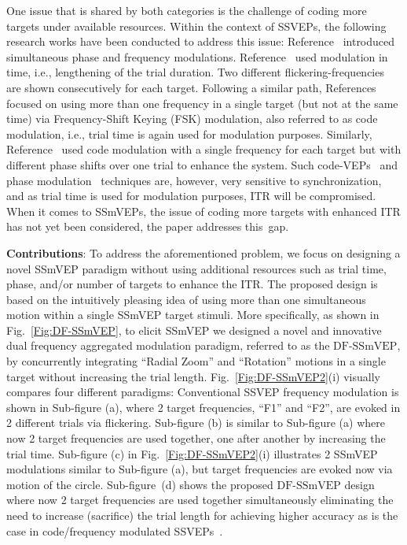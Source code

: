 \documentclass[sensors,accept,moreauthors,pdftex,10pt,a4paper]{mdpi}
\def\DFS{\text{DF-SSmVEP}} %
\theoremstyle{mdpi}
\newcounter{ex}
\newcounter{re}
\theoremstyle{mdpidefinition}
\begin{document}
One issue that is shared by both categories is the challenge of coding more targets under available resources. Within the context of SSVEPs, the following research works have been conducted to address this issue: Reference~\cite{nakanishi2014high} introduced simultaneous phase and frequency modulations. Reference~\cite{zhang2012multiple} used modulation in time, i.e.,  lengthening of the trial duration. Two different flickering-frequencies are shown consecutively for each target. Following a similar path, References~\cite{zhao2017ssvep} focused on using more than one frequency in a single target (but not at the same time) via Frequency-Shift Keying (FSK) modulation, also referred to as code modulation, i.e., trial time is again used for modulation purposes. Similarly, Reference~\cite{wei2016stimulus} used code modulation with a single frequency for each target but with different phase shifts over one trial to enhance the system. Such  code-VEPs~\cite{Kadioglu, zhao2017ssvep, wei2016stimulus} and phase modulation~\cite{nakanishi2014high, wei2016stimulus} techniques are, however, very sensitive to synchronization, and as trial time is used for modulation purposes, ITR will be compromised. When it comes to SSmVEPs, the issue of coding more targets with enhanced ITR has not yet been considered, the paper addresses this~gap.

\vspace{.1in}
\noindent
\textbf{Contributions}:
To address the aforementioned problem, we focus on designing a novel SSmVEP paradigm without using additional  resources such as trial time, phase, and/or number of targets to enhance the ITR. The proposed design is based on the intuitively pleasing idea of using more than one simultaneous motion within a single SSmVEP target stimuli. More specifically, as shown in Fig.~\ref{Fig:DF-SSmVEP}, to elicit SSmVEP we designed a novel and innovative dual frequency aggregated modulation paradigm, referred to as the $\DFS$, by concurrently integrating ``Radial Zoom'' and ``Rotation'' motions in a single target without increasing the trial length. Fig.~\ref{Fig:DF-SSmVEP2}(i) visually compares four different paradigms:  Conventional SSVEP frequency modulation is shown in Sub-figure (a), where 2 target frequencies, ``F1'' and ``F2'', are evoked in 2 different trials via flickering. Sub-figure (b) is similar to  Sub-figure (a) where now 2 target frequencies are used together, one after another by increasing the trial time. Sub-figure (c) in Fig.~\ref{Fig:DF-SSmVEP2}(i) illustrates 2 SSmVEP modulations similar to Sub-figure (a), but target frequencies are evoked now via motion of the circle.   Sub-figure~(d) shows the proposed $\DFS$ design where now 2 target frequencies are used together simultaneously eliminating the need to increase (sacrifice) the trial length for achieving higher accuracy as is the case in code/frequency modulated SSVEPs~\cite{zhao2017ssvep, wei2016stimulus}.
\end{document}
